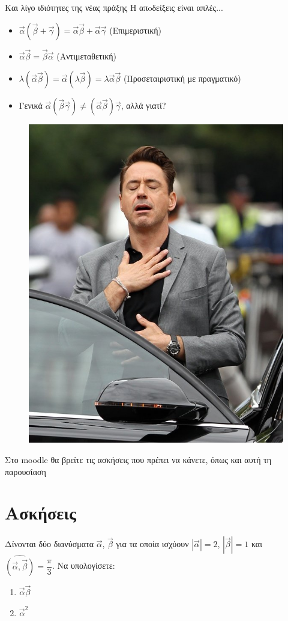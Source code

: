 \documentclass{../../presentation}
\begin{document}
\begin{frame}{Και λίγο ιδιότητες της νέας πράξης}
  Η απoδείξεις είναι απλές...
  \begin{itemize}
    \item<1-> $\vec{α}(\vec{β}+\vec{γ})=\vec{α}\vec{β}+\vec{α}\vec{γ}$ (Επιμεριστική)
    \item<2-> $\vec{α}\vec{β}=\vec{β}\vec{α}$ (Αντιμεταθετική)
    \item<3-> $λ(\vec{α}\vec{β})=\vec{α}(λ\vec{β})=λ\vec{α}\vec{β}$ (Προσεταιριστική με πραγματικό)
    \item<4-> Γενικά $\vec{α}(\vec{β}\vec{γ})\ne (\vec{α}\vec{β})\vec{γ}$, αλλά γιατί?
  \end{itemize}
\end{frame}

\begin{frame}
  \begin{figure}
    \centering
    \includegraphics[width=0.5 \textwidth]{"../images/relief"}
  \end{figure}
\end{frame}

\begin{frame}
  Στο moodle θα βρείτε τις ασκήσεις που πρέπει να κάνετε, όπως και αυτή τη παρουσίαση
\end{frame}

\section{Ασκήσεις}

\begin{askisi}
  Δίνονται δύο διανύσματα $\vec{α}$, $\vec{β}$ για τα οποία ισχύουν $|\vec{α}|=2$, $|\vec{β}|=1$ και $\widehat{(\vec{α }, \vec{β })}=\dfrac{\pi}{3}$. Να υπολογίσετε:
  \begin{enumerate}
    \item<1-> $\vec{α}\vec{β}$
    \item<2-> $\vec{α}^2$
  \end{enumerate}

\end{askisi}
\end{document}
